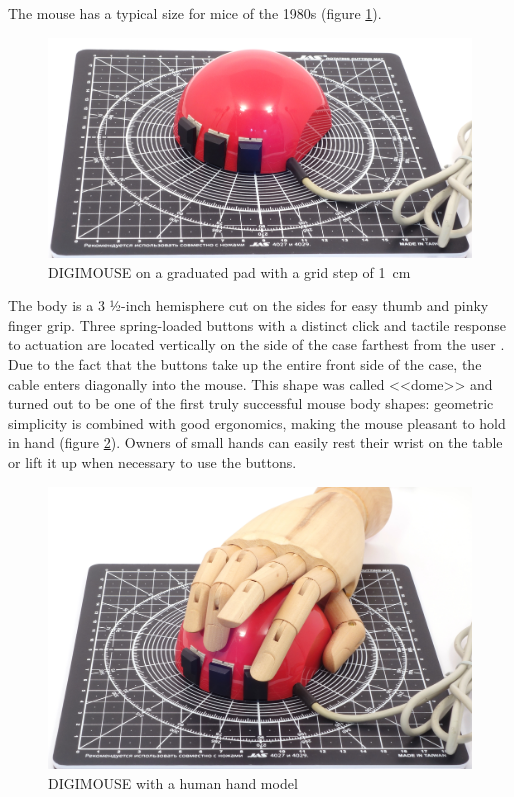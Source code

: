 \documentclass[11pt, a4paper]{article}
\begin{document}
The mouse has a typical size for mice of the 1980s (figure \ref{fig:DIGIMOUSEP4Size}).

\begin{figure}[h]
    \centering
    \includegraphics[scale=0.5]{1982_depraz_digimouse/size_30.jpg}
    \caption{DIGIMOUSE on a graduated pad with a grid step of 1~cm}
    \label{fig:DIGIMOUSEP4Size}
\end{figure}

The body is a 3 ½-inch hemisphere cut on the sides for easy thumb and pinky finger grip. Three spring-loaded buttons with a distinct click and tactile response to actuation are located vertically on the side of the case farthest from the user \cite{oldmouse}. Due to the fact that the buttons take up the entire front side of the case, the cable enters diagonally into the mouse. This shape was called <<dome>> and turned out to be one of the first truly successful mouse body shapes: geometric simplicity is combined with good ergonomics, making the mouse pleasant to hold in hand (figure \ref{fig:DIGIMOUSEP4Hand}). Owners of small hands can easily rest their wrist on the table or lift it up when necessary to use the buttons.

\begin{figure}[h]
    \centering
    \includegraphics[scale=0.5]{1982_depraz_digimouse/hand_30.jpg}
    \caption{DIGIMOUSE with a human hand model}
    \label{fig:DIGIMOUSEP4Hand}
\end{figure}
\end{document}
